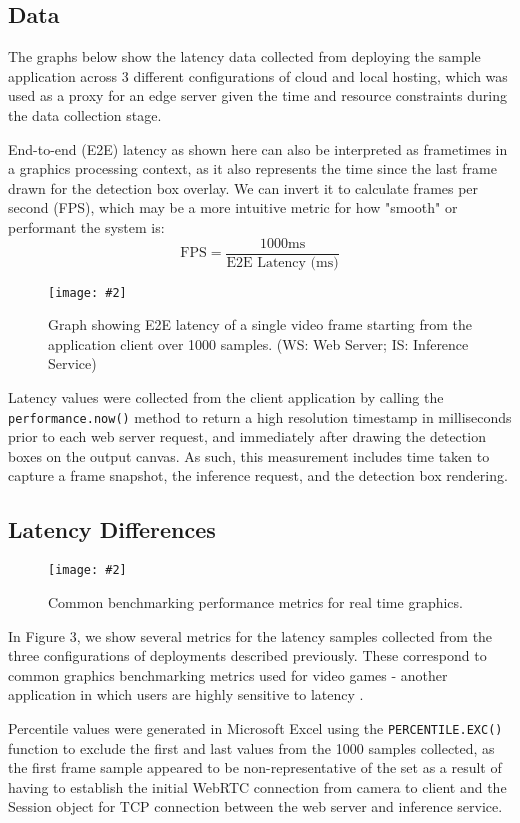 \documentclass[11pt]{article}
\newcommand{\capfigure}[3][0.5] {
    \begin{figure}[H]
    \centering
    \texttt{[image: \#2]}
    \caption{#3}
    \end{figure}
}
\begin{document}
\subsection{Data}
The graphs below show the latency data collected from deploying the sample application across 3
different configurations of cloud and local hosting, which was used as a proxy for an edge server 
given the time and resource constraints during the data collection stage. \newline

End-to-end (E2E) latency as shown here can also be interpreted as frametimes in a graphics processing 
context, as it also represents the time since the last frame drawn for the detection box overlay.
We can invert it to calculate frames per second (FPS), which may be a more intuitive metric for
how "smooth" or performant the system is:
$$
\text{FPS}=\frac{1000\text{ms}}{\text{E2E Latency (ms)}}
$$

\capfigure[]{images/latency1}{Graph showing E2E latency of a single 
video frame starting from the application client over 1000 samples. 
(WS: Web Server; IS: Inference Service)}
Latency values were collected from the client application by calling the \lstinline|performance.now()|
method to return a high resolution timestamp in milliseconds prior to each web server request,
and immediately after drawing the detection boxes on the output canvas. As such, this measurement 
includes time taken to capture a frame snapshot, the inference request, and the detection box rendering.

\subsection{Latency Differences}
\capfigure[]{images/latency3}{Common benchmarking performance metrics for real time graphics.}
In Figure 3, we show several metrics for the latency samples collected from the three
configurations of deployments described previously. These correspond to common graphics benchmarking
metrics used for video games - another application in which users are highly sensitive to latency \cite{liu_effects_2023}.
\newline

Percentile values were generated in Microsoft Excel using the \lstinline|PERCENTILE.EXC()| 
function to exclude the first and last values from the 1000 samples collected, as the first frame
sample appeared to be non-representative of the set as a result of having to establish the 
initial WebRTC connection from camera to client and the Session object for TCP connection between 
the web server and inference service.\newline
\end{document}
